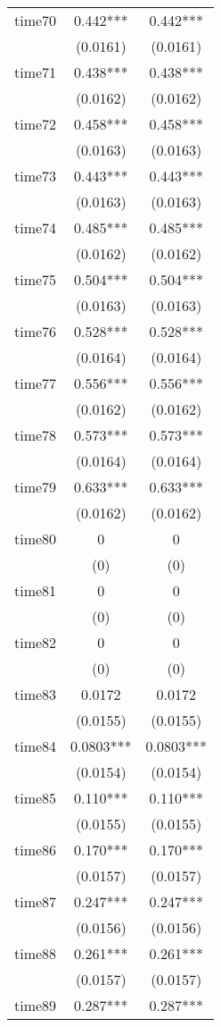 \documentclass[]{article}
\begin{document}
\begin{tabular}{lcc}
time70 & 0.442*** & 0.442*** \\
 & (0.0161) & (0.0161) \\
time71 & 0.438*** & 0.438*** \\
 & (0.0162) & (0.0162) \\
time72 & 0.458*** & 0.458*** \\
 & (0.0163) & (0.0163) \\
time73 & 0.443*** & 0.443*** \\
 & (0.0163) & (0.0163) \\
time74 & 0.485*** & 0.485*** \\
 & (0.0162) & (0.0162) \\
time75 & 0.504*** & 0.504*** \\
 & (0.0163) & (0.0163) \\
time76 & 0.528*** & 0.528*** \\
 & (0.0164) & (0.0164) \\
time77 & 0.556*** & 0.556*** \\
 & (0.0162) & (0.0162) \\
time78 & 0.573*** & 0.573*** \\
 & (0.0164) & (0.0164) \\
time79 & 0.633*** & 0.633*** \\
 & (0.0162) & (0.0162) \\
time80 & 0 & 0 \\
 & (0) & (0) \\
time81 & 0 & 0 \\
 & (0) & (0) \\
time82 & 0 & 0 \\
 & (0) & (0) \\
time83 & 0.0172 & 0.0172 \\
 & (0.0155) & (0.0155) \\
time84 & 0.0803*** & 0.0803*** \\
 & (0.0154) & (0.0154) \\
time85 & 0.110*** & 0.110*** \\
 & (0.0155) & (0.0155) \\
time86 & 0.170*** & 0.170*** \\
 & (0.0157) & (0.0157) \\
time87 & 0.247*** & 0.247*** \\
 & (0.0156) & (0.0156) \\
time88 & 0.261*** & 0.261*** \\
 & (0.0157) & (0.0157) \\
time89 & 0.287*** & 0.287*** \\

\end{tabular}
\end{document}

